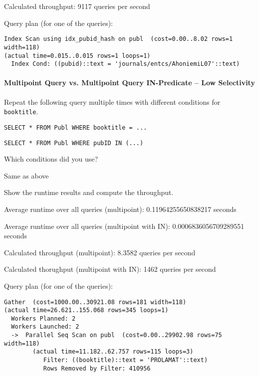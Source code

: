 \documentclass[11pt]{scrartcl}
\begin{document}
Calculated throughput: 9117 queries per second

Query plan (for one of the queries): 

{\small
\parskip0pt\begin{verbatim}
Index Scan using idx_pubid_hash on publ  (cost=0.00..8.02 rows=1 width=118) 
(actual time=0.015..0.015 rows=1 loops=1)
  Index Cond: ((pubid)::text = 'journals/entcs/AhoniemiL07'::text)
\end{verbatim}}

\paragraph{Multipoint Query vs. Multipoint Query IN-Predicate -- Low Selectivity}

Repeat the following query multiple times with different conditions for \texttt{booktitle}.

\begin{lstlisting}[style=dbtsql]
SELECT * FROM Publ WHERE booktitle = ...
\end{lstlisting}

\begin{lstlisting}[style=dbtsql]
SELECT * FROM Publ WHERE pubID IN (...)
\end{lstlisting}


Which conditions did you use?

Same as above

Show the runtime results and compute the throughput.

Average runtime over all queries (multipoint): 0.11964255650838217 seconds

Average runtime over all queries (multipoint with IN): 0.0006836056709289551 seconds

Calculated throughput (multipoint): 8.3582 queries per second

Calculated thorughput (multipoint with IN): 1462 queries per second

Query plan (for one of the queries): 

{\small
\parskip0pt\begin{verbatim}
Gather  (cost=1000.00..30921.08 rows=181 width=118) 
(actual time=26.621..155.068 rows=345 loops=1)
  Workers Planned: 2
  Workers Launched: 2
  ->  Parallel Seq Scan on publ  (cost=0.00..29902.98 rows=75 width=118) 
        (actual time=11.182..62.757 rows=115 loops=3)
           Filter: ((booktitle)::text = 'PROLAMAT'::text)
           Rows Removed by Filter: 410956   
\end{verbatim}}
\end{document}
